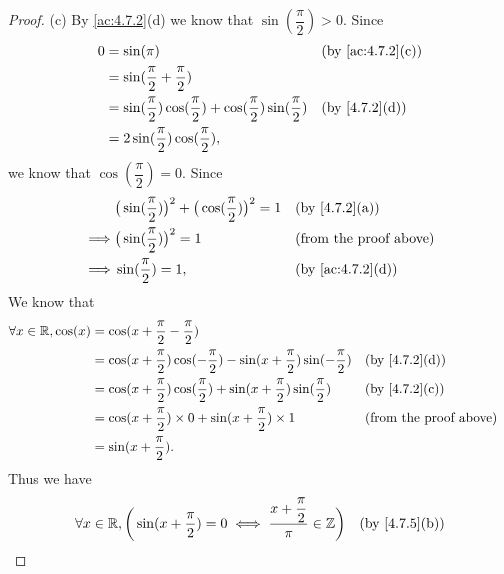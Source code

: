 \begin{proof}{(c)}
  By \cref{ac:4.7.2}(d) we know that \(\sin(\dfrac{\pi}{2}) > 0\).
  Since
  \begin{align*}
    0 & = \sin(\pi)                                                                             &  & \text{(by \cref{ac:4.7.2}(c))} \\
      & = \sin(\dfrac{\pi}{2} + \dfrac{\pi}{2})                                                                                     \\
      & = \sin(\dfrac{\pi}{2}) \cos(\dfrac{\pi}{2}) + \cos(\dfrac{\pi}{2}) \sin(\dfrac{\pi}{2}) &  & \text{(by \cref{4.7.2}(d))}    \\
      & = 2 \sin(\dfrac{\pi}{2}) \cos(\dfrac{\pi}{2}),
  \end{align*}
  we know that \(\cos(\dfrac{\pi}{2}) = 0\).
  Since
  \begin{align*}
             & \big(\sin(\dfrac{\pi}{2})\big)^2 + \big(\cos(\dfrac{\pi}{2})\big)^2 = 1 &  & \text{(by \cref{4.7.2}(a))}    \\
    \implies & \big(\sin(\dfrac{\pi}{2})\big)^2 = 1                                    &  & \text{(from the proof above)}  \\
    \implies & \sin(\dfrac{\pi}{2}) = 1,                                               &  & \text{(by \cref{ac:4.7.2}(d))}
  \end{align*}
  We know that
  \begin{align*}
    \forall x \in \R, \cos(x) & = \cos(x + \dfrac{\pi}{2} - \dfrac{\pi}{2})                                                                                          \\
                              & = \cos(x + \dfrac{\pi}{2}) \cos(-\dfrac{\pi}{2}) - \sin(x + \dfrac{\pi}{2}) \sin(-\dfrac{\pi}{2}) &  & \text{(by \cref{4.7.2}(d))}   \\
                              & = \cos(x + \dfrac{\pi}{2}) \cos(\dfrac{\pi}{2}) + \sin(x + \dfrac{\pi}{2}) \sin(\dfrac{\pi}{2})   &  & \text{(by \cref{4.7.2}(c))}   \\
                              & = \cos(x + \dfrac{\pi}{2}) \times 0 + \sin(x + \dfrac{\pi}{2}) \times 1                           &  & \text{(from the proof above)} \\
                              & = \sin(x + \dfrac{\pi}{2}).
  \end{align*}
  Thus we have
  \begin{align*}
         & \forall x \in \R, \bigg(\sin(x + \dfrac{\pi}{2}) = 0 \iff \dfrac{x + \dfrac{\pi}{2}}{\pi} \in \Z\bigg)   &  & \text{(by \cref{4.7.5}(b))}   \\

\end{align*}
\end{proof}
